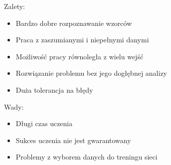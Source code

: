 \documentclass[11pt,a4paper]{article}
\begin{document}
\noindent 
Zalety:
\begin{itemize}
\item  Bardzo dobre rozpoznawanie wzorców
\item  Praca z zaszumianymi i niepełnymi danymi
\item  Możliwość pracy równoległa z wielu wejść
\item  Rozwiązanie problemu bez jego dogłębnej analizy
\item  Duża tolerancja na błędy
\end{itemize}

\noindent 
Wady:
\begin{itemize}
\item  Długi czas uczenia 
\item  Sukces uczenia nie jest gwarantowany 
\item  Problemy z wyborem danych do treningu sieci 
\end{itemize}
\end{document}
